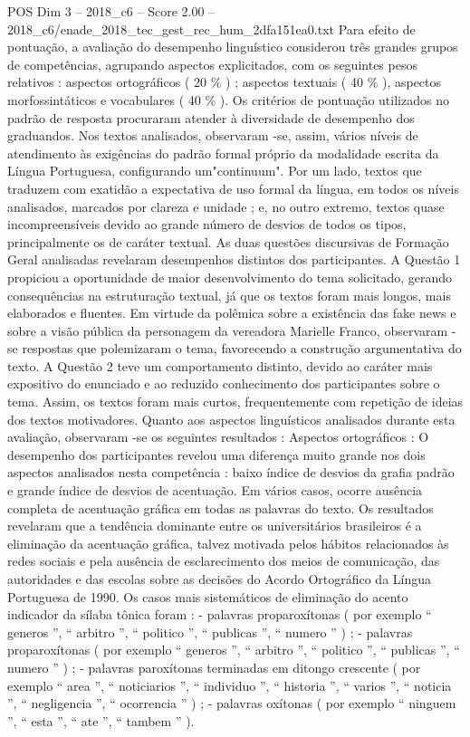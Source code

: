\begin{textsample}{POS Dim 3 – 2018\_c6 – Score 2.00 – 2018\_c6/enade\_2018\_tec\_gest\_rec\_hum\_2dfa151ea0.txt}
Para efeito de pontuação, a avaliação do desempenho linguístico considerou três grandes grupos de competências, agrupando aspectos explicitados, com os seguintes pesos relativos : aspectos ortográficos ( 20 \% ) ; aspectos textuais ( 40 \% ), aspectos morfossintáticos e vocabulares ( 40 \% ).
Os critérios de pontuação utilizados no padrão de resposta procuraram atender à diversidade de desempenho dos graduandos.
Nos textos analisados, observaram -se, assim, vários níveis de atendimento às exigências do padrão formal próprio da modalidade escrita da Língua Portuguesa, configurando um"continuum".
Por um lado, textos que traduzem com exatidão a expectativa de uso formal da língua, em todos os níveis analisados, marcados por clareza e unidade ; e, no outro extremo, textos quase incompreensíveis devido ao grande número de desvios de todos os tipos, principalmente os de caráter textual.
As duas questões discursivas de Formação Geral analisadas revelaram desempenhos distintos dos participantes.
A Questão 1 propiciou a oportunidade de maior desenvolvimento do tema solicitado, gerando consequências na estruturação textual, já que os textos foram mais longos, mais elaborados e fluentes.
Em virtude da polêmica sobre a existência das fake news e sobre a visão pública da personagem da vereadora Marielle Franco, observaram -se respostas que polemizaram o tema, favorecendo a construção argumentativa do texto.
A Questão 2 teve um comportamento distinto, devido ao caráter mais expositivo do enunciado e ao reduzido conhecimento dos participantes sobre o tema.
Assim, os textos foram mais curtos, frequentemente com repetição de ideias dos textos motivadores.
Quanto aos aspectos linguísticos analisados durante esta avaliação, observaram -se os seguintes resultados : Aspectos ortográficos : O desempenho dos participantes revelou uma diferença muito grande nos dois aspectos analisados nesta competência : baixo índice de desvios da grafia padrão e grande índice de desvios de acentuação.
Em vários casos, ocorre ausência completa de acentuação gráfica em todas as palavras do texto.
Os resultados revelaram que a tendência dominante entre os universitários brasileiros é a eliminação da acentuação gráfica, talvez motivada pelos hábitos relacionados às redes sociais e pela ausência de esclarecimento dos meios de comunicação, das autoridades e das escolas sobre as decisões do Acordo Ortográfico da Língua Portuguesa de 1990.
Os casos mais sistemáticos de eliminação do acento indicador da sílaba tônica foram : - palavras proparoxítonas ( por exemplo “ generos ”, “ arbitro ”, “ politico ”, “ publicas ”, “ numero ” ) ; - palavras proparoxítonas ( por exemplo “ generos ”, “ arbitro ”, “ politico ”, “ publicas ”, “ numero ” ) ; - palavras paroxítonas terminadas em ditongo crescente ( por exemplo “ area ”, “ noticiarios ”, “ individuo ”, “ historia ”, “ varios ”, “ noticia ”, “ negligencia ”, “ ocorrencia ” ) ; - palavras oxítonas ( por exemplo “ ninguem ”, “ esta ”, “ ate ”, “ tambem ” ).

\end{textsample}
